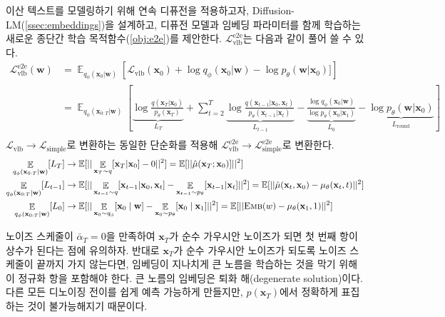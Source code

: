 \documentclass{article}
\newcommand{\exper}[1]{\textsc{#1}}
\newcommand{\expmb}[1]{\mathbf{#1}}
\newcommand{\expobj}[1]{\mathcal{L}_\text{#1}}
\newcommand{\alphabar}{\bar{\alpha}}
\newcommand{\ww}{\expmb{w}}
\newcommand{\cx}[1]{\mathbf{x}_{#1}}
\newcommand{\ptheta}{p_\theta}
\newcommand{\qphi}{q_\phi}
\newcommand{\Lsimple}{\expobj{simple}}
\newcommand{\Lvlb}{\expobj{vlb}}
\newcommand{\Lsimpleee}{\mathcal{L}^\text{e2e}_\text{simple}}
\newcommand{\Emb}{\exper{Emb}}
\begin{document}
이산 텍스트를 모델링하기 위해 연속 디퓨전을 적용하고자, Diffusion-LM(\cref{ssec:embeddings})을 설계하고, 디퓨전 모델과 임베딩 파라미터를 함께 학습하는 새로운 종단간 학습 목적함수(\cref{obj:e2e})를 제안한다. $\Lvlb^{\text{e2e}}$는 다음과 같이 풀어 쓸 수 있다.
\begin{align*}
    \mathcal{L}^\text{e2e}_{\text{vlb}} (\ww) &= \mathop{\mathbb{E}}_{q_\phi(\cx{0} | \ww)}\left[\mathcal{L}_{\text{vlb}} (\cx{0}) + \log \qphi(\cx{0} | \ww) - \log \ptheta(\ww | \cx{0})]\right] \\
    &= \mathop{\mathbb{E}}_{q_\phi(\cx{0:T} | \ww)}  \left[\underbrace{\log \frac{q(\cx{T} | \cx{0})}{\ptheta(\cx{T})}}_{L_T} + \sum_{t=2}^T \underbrace{\log \frac{q(\cx{t-1} | \cx{0},\cx{t})} {\ptheta(\cx{t-1} | \cx{t}) }}_{L_{t-1}} - \underbrace{\frac{\log \qphi(\cx{0} | \ww)}{\log \ptheta( \cx{0} | \cx{1})}}_{L_{0}}     - \underbrace{\log \ptheta(\ww | \cx{0})}_{L_\text{round}}\right]  \\
\end{align*}
$\Lvlb \rightarrow \Lsimple$로 변환하는 동일한 단순화를 적용해 $\mathcal{L}^\text{e2e}_{\text{vlb}} \rightarrow \Lsimpleee$로 변환한다.
\begin{align*}
    \mathop{\mathbb{E}}_{q_\phi(\cx{0:T} | \ww)} [L_T] & \rightarrow \mathbb{E}[||\mathop{\mathbb{E}}_{\cx{T}\sim q}[\cx{T}| \cx{0}] - 0 ||^2] = \mathbb{E}[||\hat{\mu}(\cx{T}; \cx{0})] ||^2] \\
    \mathop{\mathbb{E}}_{q_\phi(\cx{0:T} | \ww)} [L_{t-1}] & \rightarrow \mathbb{E}[|| \mathop{\mathbb{E}}_{\cx{t-1}\sim q}[\cx{t-1}| \cx{0}, \cx{t}] - \mathop{\mathbb{E}}_{\cx{t-1} \sim \ptheta}  [\cx{t-1} | \cx{t}] ||^2] =\mathbb{E}[ ||\hat{\mu}(\cx{t}, \cx{0})-\mu_\theta(\cx{t}, t) ||^2]\\
    \mathop{\mathbb{E}}_{q_\phi(\cx{0:T} | \ww)} [L_{0}] & \rightarrow \mathbb{E}[|| \mathop{\mathbb{E}}_{\cx{0}\sim\qphi} [\cx{0} \mid \ww] - \mathop{\mathbb{E}}_{\cx{0} \sim \ptheta} [\cx{0}  \mid \cx{1} ] ||^2] = \mathbb{E}[ ||\Emb(w)-\mu_\theta(\cx{1}, 1) ||^2]
\end{align*}

노이즈 스케줄이 $\alphabar_T = 0$을 만족하여 $\cx{T}$가 순수 가우시안 노이즈가 되면 첫 번째 항이 상수가 된다는 점에 유의하자.
반대로 $\cx{T}$가 순수 가우시안 노이즈가 되도록 노이즈 스케줄이 끝까지 가지 않는다면, 임베딩이 지나치게 큰 노름을 학습하는 것을 막기 위해 이 정규화 항을 포함해야 한다. 큰 노름의 임베딩은 퇴화 해(degenerate solution)이다. 다른 모든 디노이징 전이를 쉽게 예측 가능하게 만들지만, $p(\cx{T})$에서 정확하게 표집하는 것이 불가능해지기 때문이다.
\end{document}
